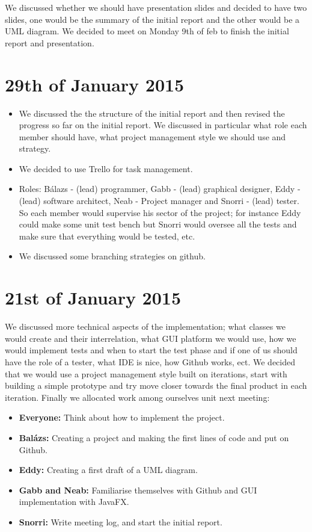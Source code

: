 \documentclass[11pt]{article}
\begin{document}
We discussed whether we should have presentation slides and decided to have two slides, one would be the summary of the initial report and the other would be a UML diagram. We decided to meet on Monday 9th of feb to finish the initial report and presentation.

\newpage

\section{29th of January 2015}
\begin{itemize}
\item We discussed the the structure of the initial report and then revised the progress so far on the initial report. We discussed in particular what role each member should have, what project management style we should use and strategy.
\item We decided to use Trello for task management.
\item Roles: Bálazs - (lead) programmer, Gabb - (lead) graphical designer, Eddy - (lead) software architect, Neab - Project manager and Snorri - (lead) tester. So each member would supervise his sector of the project; for instance Eddy could make some unit test bench but Snorri would oversee all the tests and make sure that everything would be tested, etc.
\item We discussed some branching strategies on github. 
\end{itemize} 

\newpage

\section{21st of January 2015}
We discussed more technical aspects of the implementation; what classes we would create and their interrelation, what GUI platform we would use, how we would implement tests and when to start the test phase and if one of us should have the role of a tester, what IDE is nice, how Github works, ect. We decided that we would use a project management style built on iterations, start with building a simple prototype and try move closer towards the final product in each iteration. Finally we allocated work among ourselves unit next meeting:
\begin{itemize}
\item \textbf{Everyone:} Think about how to implement the project.

\item \textbf{Balázs:} Creating a project and making the first lines of code and put on Github.

\item \textbf{Eddy:} Creating a first draft of a UML diagram.

\item \textbf{Gabb and Neab:} Familiarise themselves with Github and GUI implementation with JavaFX.

\item \textbf{Snorri:} Write meeting log, and start the initial report.

\end{itemize} 
\end{document}
